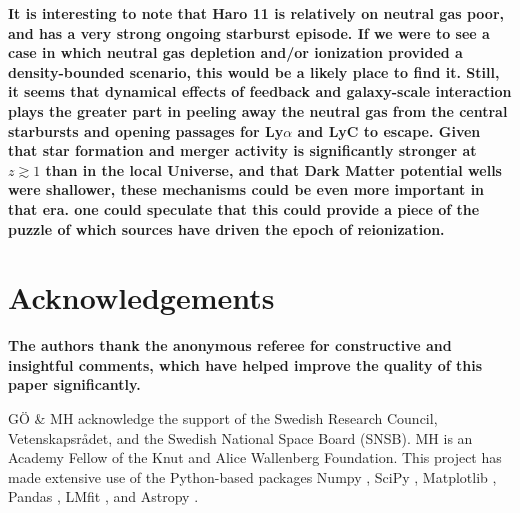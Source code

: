 \documentclass[twocolumn, trackchanges]{aastex61}
\begin{document}
\textbf{It is interesting to note that Haro 11 is relatively on neutral 
gas poor, and has a very strong ongoing starburst episode. If we were to see a 
case in which neutral gas depletion and/or ionization provided a 
density-bounded scenario, this would be a likely place to find it. 
Still, it seems that dynamical effects of feedback and galaxy-scale 
interaction plays the greater part in peeling away the neutral gas from the 
central starbursts and opening passages for Ly$\alpha$ and LyC to 
escape. Given that star formation and merger activity is significantly stronger 
at $z\gtrsim 1$ than in the local Universe, and that Dark Matter potential wells
were shallower, these mechanisms could be even more important in that era. 
one could speculate that this could provide a piece of the puzzle of which
sources have driven the epoch of reionization.}


\section*{Acknowledgements}\label{acknowledgements}

\textbf{The authors thank the anonymous referee for constructive and insightful 
comments, which have helped improve the quality of this paper significantly.} 

GÖ \& MH acknowledge the support of the Swedish Research Council,
Vetenskapsrådet, and the Swedish National Space Board (SNSB). MH is an
Academy Fellow of the Knut and Alice Wallenberg Foundation. This project
has made extensive use of the Python-based packages Numpy \citep{Numpy},
SciPy \citep{SciPy}, Matplotlib \citep{Matplotlib}, Pandas
\citep{Pandas}, LMfit \citep{lmfit2014}, and Astropy
\citep{Astropy2013}.



\end{document}
